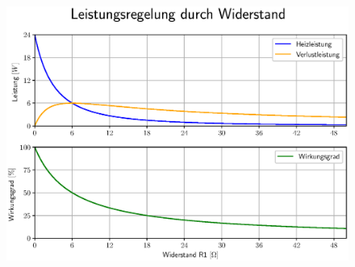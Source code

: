 \documentclass{beamer}
\begin{document}
	\begin{frame}
		\begin{center}
		\begin{figure}[tbh]
			\centering
			\includegraphics[width=0.95\linewidth]{medien/1.eps}
			\label{fig:wirkungsgrad1}
		\end{figure}
		\end{center}
	\end{frame}
\end{document}
